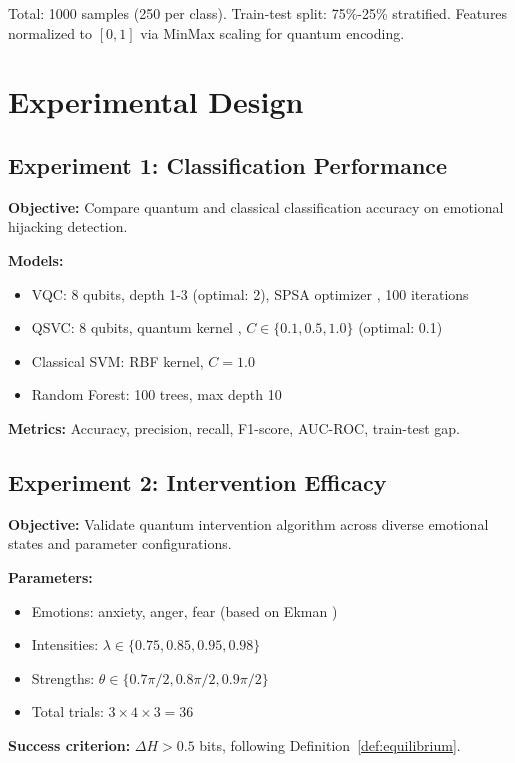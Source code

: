 \documentclass[11pt,letterpaper]{article}
\begin{document}
Total: 1000 samples (250 per class). Train-test split: 75\%-25\% stratified. Features normalized to $[0,1]$ via MinMax scaling for quantum encoding.

\section{Experimental Design}
\label{sec:experiments}

\subsection{Experiment 1: Classification Performance}

\textbf{Objective:} Compare quantum and classical classification accuracy on emotional hijacking detection.

\textbf{Models:}
\begin{itemize}
\item VQC: 8 qubits, depth 1-3 (optimal: 2), SPSA optimizer \cite{spall1992multivariate}, 100 iterations
\item QSVC: 8 qubits, quantum kernel \cite{havlicek2019supervised}, $C \in \{0.1, 0.5, 1.0\}$ (optimal: 0.1)
\item Classical SVM: RBF kernel, $C=1.0$
\item Random Forest: 100 trees, max depth 10
\end{itemize}

\textbf{Metrics:} Accuracy, precision, recall, F1-score, AUC-ROC, train-test gap.

\subsection{Experiment 2: Intervention Efficacy}

\textbf{Objective:} Validate quantum intervention algorithm across diverse emotional states and parameter configurations.

\textbf{Parameters:}
\begin{itemize}
\item Emotions: anxiety, anger, fear (based on Ekman \cite{ekman1992argument})
\item Intensities: $\lambda \in \{0.75, 0.85, 0.95, 0.98\}$
\item Strengths: $\theta \in \{0.7\pi/2, 0.8\pi/2, 0.9\pi/2\}$
\item Total trials: $3 \times 4 \times 3 = 36$
\end{itemize}

\textbf{Success criterion:} $\Delta H > 0.5$ bits, following Definition~\ref{def:equilibrium}.
\end{document}
